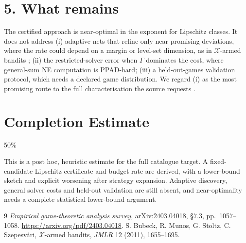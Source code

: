 \documentclass[11pt]{article}
\theoremstyle{definition}
\begin{document}
\section*{5. What remains}
The certified approach is near-optimal in the exponent for Lipschitz classes. It does not address (i) adaptive nets
that refine only near promising deviations, where the rate could depend on a margin or level-set dimension, as in
$\mathcal X$-armed bandits \cite{bmss}; (ii) the restricted-solver error when $\Gamma$ dominates the cost, where
general-sum NE computation is PPAD-hard; (iii) a held-out-games validation protocol, which needs a declared game
distribution. We regard (i) as the most promising route to the full characterisation the source requests \cite{egta}.

\section{Completion Estimate}
50\%

This is a post hoc, heuristic estimate for the full catalogue target.
A fixed-candidate Lipschitz certificate and budget rate are derived, with a lower-bound sketch and explicit worsening after strategy expansion. Adaptive discovery, general solver costs and held-out validation are still absent, and near-optimality needs a complete statistical lower-bound argument.

\begin{thebibliography}{9}
 \emph{Empirical game-theoretic analysis survey}, arXiv:2403.04018, \S7.3, pp.\ 1057--1058. \url{https://arxiv.org/pdf/2403.04018}.
 S. Bubeck, R. Munos, G. Stoltz, C. Szepesv\'ari, $\mathcal X$-armed bandits, \emph{JMLR} 12 (2011), 1655--1695.
\end{thebibliography}
\end{document}
